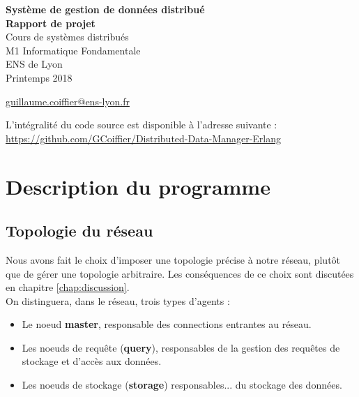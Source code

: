 \documentclass[a4paper]{report}
\begin{document}
\begin{titlepage}
\begin{center}
 {\Huge \bfseries Système de gestion de données distribué\\}
 \vspace{1cm}
 {\Large \bfseries Rapport de projet \\}
 \vspace{2cm}
 {\Large Cours de systèmes distribués \\ M1 Informatique Fondamentale \\ ENS de Lyon \\ Printemps 2018 \\}

 \vspace{2cm}

{\Large {} \color{black}
	\href{mailto:guillaume.coiffier@ens-lyon.fr}{guillaume.coiffier@ens-lyon.fr}\\
}

\vspace{10cm}
L'intégralité du code source est disponible à l'adresse suivante : \\
\url{https://github.com/GCoiffier/Distributed-Data-Manager-Erlang}

\vfill

\end{center}
\end{titlepage}


\tableofcontents

\chapter{Description du programme}
\label{chap:description}

\section{Topologie du réseau}

Nous avons fait le choix d'imposer une topologie précise à notre réseau, plutôt que de gérer une topologie arbitraire.
Les conséquences de ce choix sont discutées en chapitre \ref{chap:discussion}. \\
On distinguera, dans le réseau, trois types d'agents :
\begin{itemize}
\item Le noeud \textbf{master}, responsable des connections entrantes au réseau.
\item Les noeuds de requête (\textbf{query}), responsables de la gestion des
requêtes de stockage et d'accès aux données.
\item Les noeuds de stockage (\textbf{storage}) responsables... du stockage des données.
\end{itemize}
\end{document}
